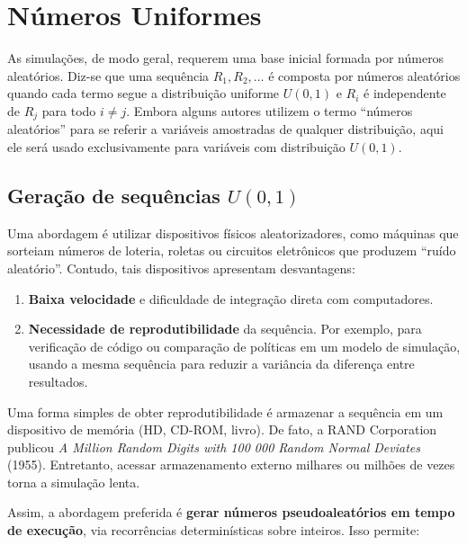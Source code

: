 \documentclass[
  letterpaper,
  DIV=11,
  numbers=noendperiod]{scrreprt}
\providecommand{\tightlist}{%
  \setlength{\itemsep}{0pt}\setlength{\parskip}{0pt}}\usepackage{longtable,booktabs,array}
\begin{document}

\chapter{Números Uniformes}\label{nuxfameros-uniformes}

As simulações, de modo geral, requerem uma base inicial formada por
números aleatórios. Diz-se que uma sequência \(R_1, R_2, \ldots\) é
composta por números aleatórios quando cada termo segue a distribuição
uniforme \(U(0,1)\) e \(R_i\) é independente de \(R_j\) para todo
\(i \neq j\). Embora alguns autores utilizem o termo ``números
aleatórios'' para se referir a variáveis amostradas de qualquer
distribuição, aqui ele será usado exclusivamente para variáveis com
distribuição \(U(0,1)\).

\section{\texorpdfstring{Geração de sequências
\(U(0,1)\)}{Geração de sequências U(0,1)}}\label{gerauxe7uxe3o-de-sequuxeancias-u01}

Uma abordagem é utilizar dispositivos físicos aleatorizadores, como
máquinas que sorteiam números de loteria, roletas ou circuitos
eletrônicos que produzem ``ruído aleatório''. Contudo, tais dispositivos
apresentam desvantagens:

\begin{enumerate}
\def\labelenumi{\arabic{enumi}.}
\tightlist
\item
  \textbf{Baixa velocidade} e dificuldade de integração direta com
  computadores.
\item
  \textbf{Necessidade de reprodutibilidade} da sequência. Por exemplo,
  para verificação de código ou comparação de políticas em um modelo de
  simulação, usando a mesma sequência para reduzir a variância da
  diferença entre resultados.
\end{enumerate}

Uma forma simples de obter reprodutibilidade é armazenar a sequência em
um dispositivo de memória (HD, CD-ROM, livro). De fato, a RAND
Corporation publicou \emph{A Million Random Digits with 100 000 Random
Normal Deviates} (1955). Entretanto, acessar armazenamento externo
milhares ou milhões de vezes torna a simulação lenta.

Assim, a abordagem preferida é \textbf{gerar números pseudoaleatórios em
tempo de execução}, via recorrências determinísticas sobre inteiros.
Isso permite:
\end{document}

